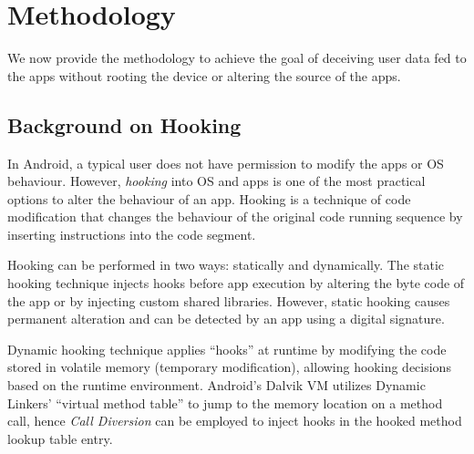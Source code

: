 \section{\framework{} Methodology}
\label{sec:methodology}

We now provide the methodology to achieve the goal of deceiving user data fed to the apps without rooting the device or altering the source of the apps.

\subsection{Background on Hooking}
In Android, a typical user does not have permission to modify the apps or OS behaviour. However, \textit{hooking} into OS and apps is one of the most practical options to alter the behaviour of an app. Hooking is a technique of code modification that changes the behaviour of the original code running sequence by inserting instructions into the code segment. 

Hooking can be performed in two ways: statically and dynamically. The static hooking technique injects hooks before app execution by altering the byte code of the app or by injecting custom shared libraries. However, static hooking causes permanent alteration and can be detected by an app using a digital signature. 

Dynamic hooking technique applies ``hooks'' at runtime by modifying the code stored in volatile memory (temporary modification), allowing hooking decisions based on the runtime environment. Android's Dalvik VM utilizes Dynamic Linkers' ``virtual method table'' to jump to the memory location on a method call, hence \textit{Call Diversion} can be employed to inject hooks in the hooked method lookup table entry. 

